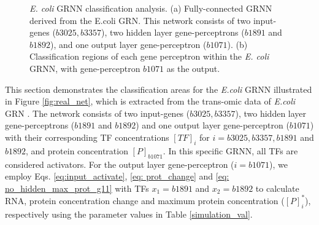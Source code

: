 \documentclass[twocolumn]{biophys-new}
\begin{document}
{{\begin{figure}[!ht]
\begin{subfigure}{0.6\textwidth}
        \caption{}
        \label{fig:subim2}
    \end{subfigure} 
    \vspace{-0.5em}
    \caption{\emph{E. coli} GRNN classification analysis.  (a) Fully-connected GRNN derived from the E.coli GRN. This network consists of two input-genes ($b3025, b3357$), two hidden layer gene-perceptrons ($b1891$ and $b1892$), and one output layer gene-perceptron ($b1071$). (b) Classification regions of each gene perceptron within the  \emph{E. coli} GRNN, with gene-perceptron $b1071$ as the output. \vspace{-0.5em} }
\end{figure}

This section demonstrates the classification areas for the  \emph{E.coli} GRNN illustrated in Figure \ref{fig:real_net}, which is extracted from the trans-omic data of \emph{E.coli} GRN \cite{tierrafria2022regulondb}.  
The network consists of two input-genes  ($b3025, b3357$), two hidden layer gene-perceptrons ($b1891$ and $b1892$) and one output layer gene-perceptron ($b1071$) with their corresponding TF concentrations $[TF]_{i}$ for $i=b3025, b3357, b1891$ and $b1892$, and protein concentration $[P]_{b1071}$. In this specific GRNN, all TFs are considered activators.
For the output layer gene-perceptron ($i=b1071$), we employ   Eqs. \ref{eq:input_activate}, \ref{eq: prot_change} and \ref{eq: no_hidden_max_prot_g11}  with TFs  $x_1=b1891$ and $x_2=b1892$  to calculate RNA, protein concentration change and maximum protein concentration ($[P]^*_i$), respectively using the parameter values in   Table \ref{simulation_val}.


}}
\end{document}

